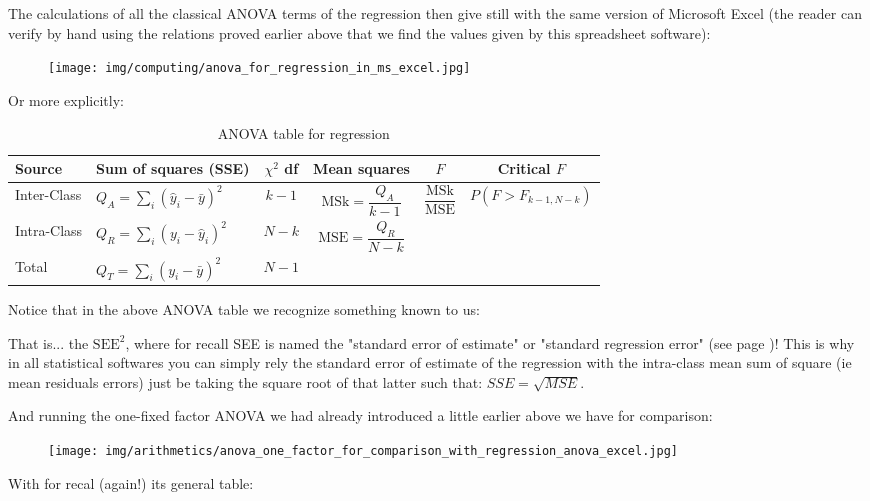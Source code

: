 	The calculations of all the classical ANOVA terms of the regression then give still with the same version of Microsoft Excel (the reader can verify by hand using the relations proved earlier above that we find the values given by this spreadsheet software):
	\begin{figure}[H]
		\centering
		\texttt{[image: img/computing/anova\_for\_regression\_in\_ms\_excel.jpg]}
	\end{figure}
	Or more explicitly:
	\begin{table}[H]\small
		\renewcommand{\arraystretch}{1.2}
		\centering
		\begin{tabular}{llcccc}\hline
		\textbf{Source} & \textbf{Sum of squares (SSE)} & $\chi^2$ \textbf{df} & \textbf{Mean squares} & $F$ & \textbf{Critical} $F$\\ \hline
		Inter-Class & $Q_A=\displaystyle\sum_{i}\left(\hat{y}_{i}-\bar{y}\right)^2$ & $k-1$ & $\text{MSk}=\displaystyle\dfrac{Q_A}{k-1}$ &
		$\displaystyle\dfrac{\text{MSk}}{\text{MSE}}$ & $P(F> F_{k-1,N-k})$ \\
		Intra-Class & $Q_R=\displaystyle\sum_{i}\left(y_i-\hat{y}_i\right)^2$ & $N-k$ & $ \text{MSE}=\displaystyle\dfrac{Q_R}{N-k}$  & & \\
		Total & $Q_T=\displaystyle\sum_{i}\left(y_i-\bar{y}\right)^2$ & $N-1$ & & &\\ \hline
		\end{tabular}
		\caption{ANOVA table for regression}
	\end{table}
	\begin{tcolorbox}[title=Remarks,colframe=black,arc=10pt]
	Notice that in the above ANOVA table we recognize something known to us:
	
	That is... the $\text{SEE}^2$, where for recall SEE is named the "standard error of estimate" or "standard regression error" (see page \pageref{standard error of estimate})! This is why in all statistical softwares you can simply rely the standard error of estimate of the regression with the intra-class mean sum of square (ie mean residuals errors) just be taking the square root of that latter such that: $SSE=\sqrt{MSE}$.
	\end{tcolorbox}
	And running the one-fixed factor ANOVA we had already introduced a little earlier above we have for comparison:
	\begin{figure}[H]
		\centering
		\texttt{[image: img/arithmetics/anova\_one\_factor\_for\_comparison\_with\_regression\_anova\_excel.jpg]}
	\end{figure}
	With for recal (again!) its general table:
